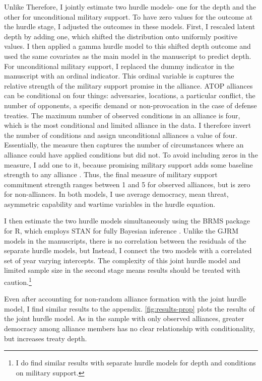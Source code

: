 \documentclass[12pt]{article}
\begin{document}
Unlike \citet{Chibaetal2015} 
Therefore, I jointly estimate two hurdle models- one for the depth and the other for unconditional military support. 
To have zero values for the outcome at the hurdle stage, I adjusted the outcomes in these models. 
First, I rescaled latent depth by adding one, which shifted the distribution onto uniformly positive values. 
I then applied a gamma hurdle model to this shifted depth outcome and used the same covariates as the main model in the manuscript to predict depth. 
For unconditional military support, I replaced the dummy indicator in the manuscript with an ordinal indicator.
This ordinal variable is captures the relative strength of the military support promise in the alliance. 
ATOP alliances can be conditional on four things: adversaries, locations, a particular conflict, the number of opponents, a specific demand or non-provocation in the case of defense treaties. 
The maximum number of observed conditions in an alliance is four, which is the most conditional and limited alliance in the data. 
I therefore invert the number of conditions and assign unconditional alliances a value of four. 
Essentially, the measure then captures the number of circumstances where an alliance could have applied conditions but did not. 
To avoid including zeros in the measure, I add one to it, because promising military support adds some baseline strength to any alliance \citep{Morrow2000}. 
Thus, the final measure of military support commitment strength ranges between 1 and 5 for observed alliances, but is zero for non-alliances. 
In both models, I use average democracy, mean threat, asymmetric capability and wartime variables in the hurdle equation. 


I then estimate the two hurdle models simultaneously using the BRMS package for R, which employs STAN for fully Bayesian inference \citep{Buerkner2017}. 
Unlike the GJRM models in the manuscripts, there is no correlation between the residuals of the separate hurdle models, but Instead, I connect the two models with a correlated set of year varying intercepts. 
The complexity of this joint hurdle model and limited sample size in the second stage means results should be treated with caution.\footnote{I do find similar results with separate hurdle models for depth and conditions on military support.} 


Even after accounting for non-random alliance formation with the joint hurdle model, I find similar results to the appendix. 
\autoref{fig:results-prop} plots the results of the joint hurdle model. 
As in the sample with only observed alliances, greater democracy among alliance members has no clear relationship with conditionality, but increases treaty depth. 
\end{document}
